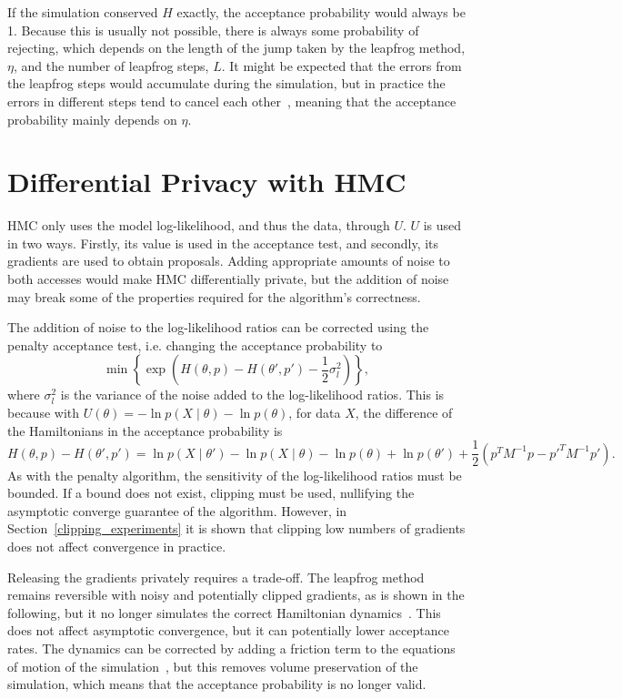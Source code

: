 \documentclass[english,twoside,openright]{HYgraduMLDS}
\begin{document}
If the simulation conserved \(H\) exactly, the acceptance probability would 
always be 1. Because this is usually not possible, there is always some probability 
of rejecting, which depends on the length of the jump taken by the leapfrog 
method, \(\eta\), and the number of leapfrog steps, \(L\). It might be expected 
that the errors from the leapfrog steps would accumulate during the simulation, 
but in practice the errors in different steps tend to cancel each 
other~\cite{neal2012mcmc}, meaning 
that the acceptance probability mainly depends on \(\eta\).

\section{Differential Privacy with HMC}\label{dp_hmc_section}

HMC only uses the model log-likelihood, and thus the data, through \(U\).
\(U\) is used in two ways. Firstly, its value is used in the acceptance test,
and secondly, its gradients are used to obtain proposals. Adding appropriate
amounts of noise to both accesses would make HMC differentially private, but the addition of
noise may break some of the properties required for the algorithm's correctness.

The addition of noise to the log-likelihood ratios can be corrected using the penalty
acceptance test, i.e. changing the acceptance probability to
\[
    \min\left\{\exp\left(H(\theta, p) - H(\theta', p') - \frac{1}{2}\sigma_{l}^{2}\right)\right\},
\]
where \(\sigma_{l}^{2}\) is the variance of the noise added to the log-likelihood
ratios. This is because with
\(U(\theta) = -\ln p(X\mid \theta) - \ln p(\theta)\),  for data \(X\),
the difference of the Hamiltonians in the acceptance probability is
\[
  H(\theta, p) - H(\theta', p') = \ln p(X\mid \theta') - \ln p(X\mid \theta)
  - \ln p(\theta) + \ln p(\theta')
  + \frac{1}{2}(p^{T}M^{-1}p - p'^{T}M^{-1}p').
\]
As with the penalty algorithm, the sensitivity of the log-likelihood ratios must
be bounded. If a bound does not exist, clipping must be used, nullifying the asymptotic
converge guarantee of the algorithm. However, in Section~\ref{clipping_experiments}
it is shown that
clipping low numbers of gradients does not affect convergence in practice.

Releasing the gradients privately requires a trade-off. The leapfrog method remains
reversible with noisy and potentially clipped gradients, as is shown in the following,
but it no longer simulates the correct Hamiltonian dynamics~\cite{CFG14}. This does not affect
asymptotic convergence, but it can potentially lower acceptance rates.
The dynamics can be corrected by adding a friction term to the equations of
motion of the simulation~\cite{CFG14}, but this removes volume preservation of the simulation,
which means that the acceptance probability is no longer valid.
\end{document}
